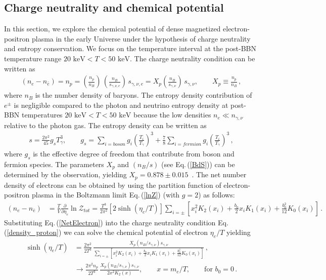 \documentclass[universe,article,submit,moreauthors,pdftex,a4paper]{Definitions/mdpi}
\newcommand{\keV}{\text{ keV}}
\newcommand{\req}[1]{Eq.\,(\ref{#1})}
\begin{document}
\subsection{Charge neutrality and chemical potential}\label{sec:ChargeNeutrality}
\noindent In this section, we explore the chemical potential of dense magnetized electron-positron plasma in the early Universe under the hypothesis of charge neutrality and entropy conservation. We focus on the temperature interval at the post-BBN temperature range $20\keV<T<50\keV$. The charge neutrality condition can be written as
\begin{align}
 \label{density_proton}
 \left(n_{e}-n_{\bar{e}}\right)=n_{p}=\left(\frac{n_{p}}{n_{B}}\right)\,\left(\frac{n_{B}}{s_{\gamma,\nu,e}}\right)\,s_{\gamma,\nu,e}= X_p\left(\frac{n_B}{s_{\gamma,\nu}}\right)\,s_{\gamma,\nu},\qquad X_p\equiv\frac{n_p}{n_B}\,,
\end{align}
where $n_B$ is the number density of baryons. The entropy density contribution of $e^\pm$ is negligible compared to the photon and neutrino entropy density at post-BBN temperatures $20\keV<T<50\keV$ because the low densities $n_e\ll n_{\gamma,\nu}$ relative to the photon gas. The entropy density can be written as~\cite{kolb1990early}
\begin{align}
s=\frac{2\pi^2}{45}g_sT_\gamma^3,\qquad g_s=\sum_{i=boson}g_i\left(\frac{T_i}{T_\gamma}\right)^3+\frac{7}{8}\sum_{i=fermion}g_i\left(\frac{T_i}{T_\gamma}\right)^3\,,
\end{align}
where $g_s$ is the effective degree of freedom that contribute from boson and fermion species. The parameters $X_p$ and $(n_B/s)$ (see \req{BdS}) can be determined by the observation, yielding $X_p=0.878\pm0.015$~\cite{ParticleDataGroup:2022pth}. The net number density of electrons can be obtained by using the partition function of electron-positron plasma in the Boltzmann limit \req{lnZ} (with $g=2$) as follows:
\begin{align}\label{NetElectron}
\left(n_e-n_{\bar e}\right)&=\frac{T}{V}\frac{\partial}{\partial \eta_{e}}\ln\mathcal{Z}_{tot}=\frac{T^3}{2\pi^2}\left[2\sinh{(\eta_{e}/T)}\right]\sum_{i=\pm}\left[x_i^2K_2(x_i)+\frac{b_0}{2}x_i K_1(x_i)+\frac{b^2_0}{12}K_0(x_i)\right]\,.
\end{align}
Substituting \req{NetElectron} into the charge neutrality condition \req{density_proton} we can solve the chemical potential of electron $\eta_e/T$ yielding
\begin{align}\label{ChemicalPotential}
\sinh{(\eta_{e}/T)}&=\frac{2\pi^2}{2T^3}\,\frac{X_p(n_B/s_{\gamma,\nu})s_{\gamma,\nu}}{\sum_{i=\pm}\left[x_i^2K_2(x_i)+\frac{b_0}{2}x_i K_1(x_i)+\frac{b^2_0}{12}K_0(x_i)\right]}\,,\\
&\longrightarrow\frac{2\pi^2n_p}{2T^3}\,\frac{X_p(n_B/s_{\gamma,\nu})s_{\gamma,\nu}}{2x^2K_2(x)},\qquad x=m_e/T,\qquad \mathrm{for}\,\,b_0=0\label{ChemiticalPotential_000}\,.
\end{align}
\end{document}
